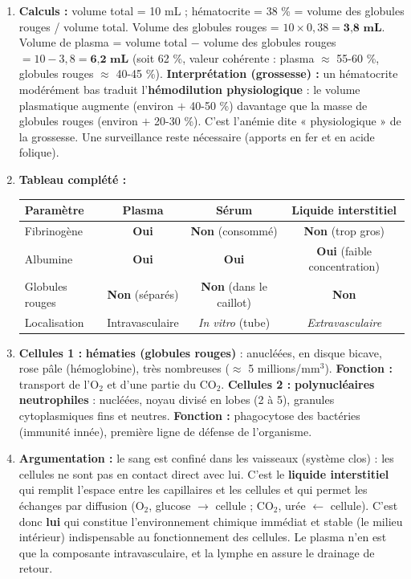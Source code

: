 \documentclass[11pt]{article}
\begin{document}
\begin{corrige}
\begin{enumerate}
    \item \textbf{Calculs :} volume total = 10 mL ; hématocrite = 38 \% = volume des globules rouges / volume total.
    Volume des globules rouges = $10 \times 0,38 = \textbf{3,8 mL}$.
    Volume de plasma = volume total $-$ volume des globules rouges $= 10 - 3,8 = \textbf{6,2 mL}$ (soit 62 \%, valeur cohérente : plasma $\approx$ 55-60 \%, globules rouges $\approx$ 40-45 \%).
    \textbf{Interprétation (grossesse) :} un hématocrite modérément bas traduit l'\textbf{hémodilution physiologique} : le volume plasmatique augmente (environ $+$ 40-50 \%) davantage que la masse de globules rouges (environ $+$ 20-30 \%). C'est l'anémie dite « physiologique » de la grossesse. Une surveillance reste nécessaire (apports en fer et en acide folique).
    \item \textbf{Tableau complété :}
    \begin{center}
    \begin{tabular}{|l|c|c|c|}\hline
    \rowcolor{popblueL}
    \textbf{Paramètre} & \textbf{Plasma} & \textbf{Sérum} & \textbf{Liquide interstitiel} \\ \hline
    Fibrinogène & \textbf{Oui} & \textbf{Non} (consommé) & \textbf{Non} (trop gros) \\ \hline
    Albumine & \textbf{Oui} & \textbf{Oui} & \textbf{Oui} (faible concentration) \\ \hline
    Globules rouges & \textbf{Non} (séparés) & \textbf{Non} (dans le caillot) & \textbf{Non} \\ \hline
    Localisation & Intravasculaire & \textit{In vitro} (tube) & \textit{Extravasculaire} \\ \hline
    \end{tabular}
    \end{center}
    \item \textbf{Cellules 1 :} \textbf{hématies (globules rouges)} : anucléées, en disque bicave, rose pâle (hémoglobine), très nombreuses ($\approx$ 5 millions/mm$^3$). \textbf{Fonction :} transport de l'O$_2$ et d'une partie du CO$_2$.
    \textbf{Cellules 2 :} \textbf{polynucléaires neutrophiles} : nucléées, noyau divisé en lobes (2 à 5), granules cytoplasmiques fins et neutres. \textbf{Fonction :} phagocytose des bactéries (immunité innée), première ligne de défense de l'organisme.
    \item \textbf{Argumentation :} le sang est confiné dans les vaisseaux (système clos) : les cellules ne sont pas en contact direct avec lui. C'est le \textbf{liquide interstitiel} qui remplit l'espace entre les capillaires et les cellules et qui permet les échanges par diffusion (O$_2$, glucose $\to$ cellule ; CO$_2$, urée $\leftarrow$ cellule). C'est donc \textbf{lui} qui constitue l'environnement chimique immédiat et stable (le milieu intérieur) indispensable au fonctionnement des cellules. Le plasma n'en est que la composante intravasculaire, et la lymphe en assure le drainage de retour.
\end{enumerate}
\end{corrige}
\end{document}
